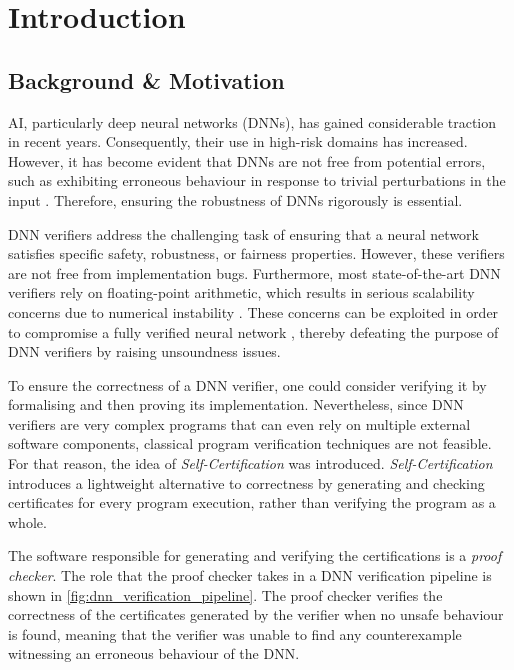 \section{Introduction}

\subsection{Background \& Motivation}

AI, particularly deep neural networks (DNNs), has gained considerable traction in recent years. Consequently, their use in high-risk domains has increased. However, it has become evident that DNNs are not free from potential errors, such as exhibiting erroneous behaviour in response to trivial perturbations in the input \cite{intriguing_properties_of_nn}. Therefore, ensuring the robustness of DNNs rigorously is essential.

DNN verifiers address the challenging task of ensuring that a neural network satisfies specific safety, robustness, or fairness properties. However, these verifiers are not free from implementation bugs. Furthermore, most state-of-the-art DNN verifiers rely on floating-point arithmetic, which results in serious scalability concerns due to numerical instability \cite{proof_minimization_in_nn_verification}. These concerns can be exploited in order to compromise a fully verified neural network \cite{exploiting_verified_nn}, thereby defeating the purpose of DNN verifiers by raising unsoundness issues.

To ensure the correctness of a DNN verifier, one could consider verifying it by formalising and then proving its implementation. Nevertheless, since DNN verifiers are very complex programs that can even rely on multiple external software components, classical program verification techniques are not feasible. For that reason, the idea of \textit{Self-Certification} \cite{program_correctness} was introduced. \textit{Self-Certification} introduces a lightweight alternative to correctness by generating and checking certificates for every program execution, rather than verifying the program as a whole.

The software responsible for generating and verifying the certifications is a \textit{proof checker}. The role that the proof checker takes in a DNN verification pipeline is shown in \autoref{fig:dnn_verification_pipeline}. The proof checker verifies the correctness of the certificates generated by the verifier when no unsafe behaviour is found, meaning that the verifier was unable to find any counterexample witnessing an erroneous behaviour of the DNN.

